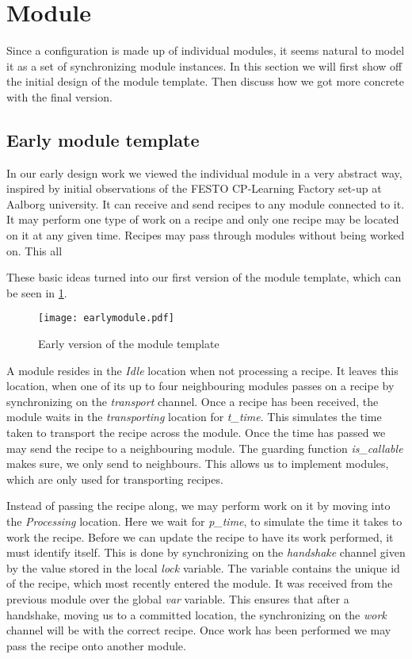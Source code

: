 \section{Module}
\label{subs:module}
Since a configuration is made up of individual modules, it seems natural to model it as a set of synchronizing module instances. In this section we will first show off the initial design of the module template. Then discuss how we got more concrete with the final version.

\subsection{Early module template}
In our early design work we viewed the individual module in a very abstract way, inspired by initial observations of the FESTO CP-Learning Factory set-up at Aalborg university. It can receive and send recipes to any module connected to it. It may perform one type of work on a recipe and only one recipe may be located on it at any given time. Recipes may pass through modules without being worked on. This all 

These basic ideas turned into our first version of the module template, which can be seen in \cref{fig:earlymodule}.


\begin{figure}[h]
\centering
\texttt{[image: earlymodule.pdf]}
\caption{Early version of the module template}
\label{fig:earlymodule}
\end{figure}

A module resides in the \emph{Idle} location when not processing a recipe. It leaves this location, when one of its up to four neighbouring modules passes on a recipe by synchronizing on the \emph{transport} channel. Once a recipe has been received, the module waits in the \emph{transporting} location for \emph{t\_time}. This simulates the time taken to transport the recipe across the module. Once the time has passed we may send the recipe to a neighbouring module. The guarding function \emph{is\_callable} makes sure, we only send to neighbours. This allows us to implement modules, which are only used for transporting recipes.

Instead of passing the recipe along, we may perform work on it by moving into the \emph{Processing} location. Here we wait for \emph{p\_time}, to simulate the time it takes to work the recipe. Before we can update the recipe to have its work performed, it must identify itself. This is done by synchronizing on the \emph{handshake} channel given by the value stored in the local \emph{lock} variable. The variable contains the unique id of the recipe, which most recently entered the module. It was received from the previous module over the global \emph{var} variable. This ensures that after a handshake, moving us to a committed location, the synchronizing on the \emph{work} channel will be with the correct recipe. Once work has been performed we may pass the recipe onto another module. 

